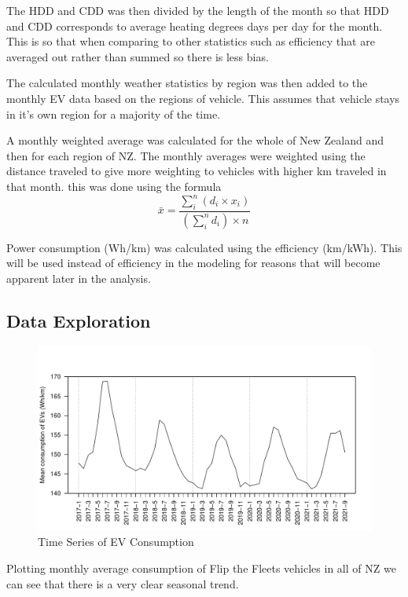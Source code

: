 \documentclass[
]{article}
\begin{document}
The HDD and CDD was then divided by the length of the month so that HDD
and CDD corresponds to average heating degrees days per day for the
month. This is so that when comparing to other statistics such as
efficiency that are averaged out rather than summed so there is less
bias.

The calculated monthly weather statistics by region was then added to
the monthly EV data based on the regions of vehicle. This assumes that
vehicle stays in it's own region for a majority of the time.

A monthly weighted average was calculated for the whole of New Zealand
and then for each region of NZ. The monthly averages were weighted using
the distance traveled to give more weighting to vehicles with higher km
traveled in that month. this was done using the formula
\[\bar{x} = \frac{\sum_{i}^{n} (d_i\times x_i)}{\left(\sum_{i}^{n} d_i\right)\times n}\]

Power consumption (Wh/km) was calculated using the efficiency (km/kWh).
This will be used instead of efficiency in the modeling for reasons that
will become apparent later in the analysis.

\hypertarget{data-exploration}{%
\subsection{Data Exploration}\label{data-exploration}}

\begin{figure}
\centering
\includegraphics{summary_week4_files/figure-latex/eff_plot-1.pdf}
\caption{Time Series of EV Consumption}
\end{figure}

Plotting monthly average consumption of Flip the Fleets vehicles in all
of NZ we can see that there is a very clear seasonal trend.
\end{document}
